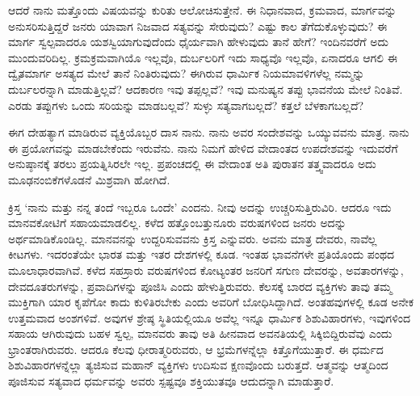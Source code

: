 ಆದರೆ ನಾನು ಮತ್ತೊಂದು ವಿಷಯವನ್ನು ಕುರಿತು ಆಲೋಚಿಸುತ್ತೇನೆ. ಈ ನಿಧಾನವಾದ, ಕ್ರಮವಾದ, ಮಾರ್ಗವನ್ನು ಅನುಸರಿಸುತ್ತಿದ್ದರೆ ಜನರು ಯಾವಾಗ ನಿಜವಾದ ಸತ್ಯವನ್ನು ಸೇರುವುದು? ಎಷ್ಟು ಕಾಲ ತೆಗೆದುಕೊಳ್ಳುವುದು? ಈ ಮಾರ್ಗ ಸ್ವಲ್ಪವಾದರೂ ಯಶಸ್ವಿಯಾಗುವುದೆಂದು ಧೈರ್ಯವಾಗಿ ಹೇಳುವುದು ತಾನೆ ಹೇಗೆ? ಇಂದಿನವರೆಗೆ ಅದು ಮುಂದುವರಿದಿಲ್ಲ. ಕ್ರಮಕ್ರಮವಾಗಿಯೊ ಇಲ್ಲವೊ, ದುರ್ಬಲರಿಗೆ ಇದು ಸಾಧ್ಯವೊ ಇಲ್ಲವೊ, ಏನಾದರೂ ಆಗಲಿ ಈ ದ್ವೈತಮಾರ್ಗ ಅಸತ್ಯದ ಮೇಲೆ ತಾನೆ ನಿಂತಿರುವುದು? ಈಗಿರುವ ಧಾರ್ಮಿಕ ನಿಯಮಾವಳಿಗಳೆಲ್ಲ ನಮ್ಮನ್ನು ದುರ್ಬಲರನ್ನಾಗಿ ಮಾಡುತ್ತಿಲ್ಲವೆ? ಆದಕಾರಣ ಇವು ತಪ್ಪಲ್ಲವೆ? ಇವು ಮನುಷ್ಯನ ತಪ್ಪು ಭಾವನೆಯ ಮೇಲೆ ನಿಂತಿವೆ. ಎರಡು ತಪ್ಪುಗಳು ಒಂದು ಸರಿಯನ್ನು ಮಾಡಬಲ್ಲವೆ? ಸುಳ್ಳು ಸತ್ಯವಾಗಬಲ್ಲದೆ? ಕತ್ತಲೆ ಬೆಳಕಾಗಬಲ್ಲದೆ?

ಈಗ ದೇಹತ್ಯಾಗ ಮಾಡಿರುವ ವ್ಯಕ್ತಿಯೊಬ್ಬರ ದಾಸ ನಾನು. ನಾನು ಅವರ ಸಂದೇಶವನ್ನು ಒಯ್ಯುವವನು ಮಾತ್ರ. ನಾನು ಈ ಪ್ರಯೋಗವನ್ನು ಮಾಡಬೇಕೆಂದು ಇರುವೆನು. ನಾನು ನಿಮಗೆ ಹೇಳಿದ ವೇದಾಂತದ ಉಪದೇಶವನ್ನು ಇದುವರೆಗೆ ಅನುಷ್ಠಾನಕ್ಕೆ ತರಲು ಪ್ರಯತ್ನಿಸಿರಲೇ ಇಲ್ಲ. ಪ್ರಪಂಚದಲ್ಲಿ ಈ ವೇದಾಂತ ಅತಿ ಪುರಾತನ ತತ್ತ್ವವಾದರೂ ಅದು ಮೂಢನಂಬಿಕೆಗಳೊಡನೆ ಮಿಶ್ರವಾಗಿ ಹೋಗಿದೆ.

ಕ್ರಿಸ್ತ `ನಾನು ಮತ್ತು ನನ್ನ ತಂದೆ ಇಬ್ಬರೂ ಒಂದೇ' ಎಂದನು. ನೀವು ಅದನ್ನು ಉಚ್ಚರಿಸುತ್ತಿರುವಿರಿ. ಆದರೂ ಇದು ಮಾನವಕೋಟಿಗೆ ಸಹಾಯಮಾಡಲಿಲ್ಲ. ಕಳೆದ ಹತ್ತೊಂಬತ್ತುನೂರು ವರುಷಗಳಿಂದ ಜನರು ಅದನ್ನು ಅರ್ಥಮಾಡಿಕೊಂಡಿಲ್ಲ. ಮಾನವನನ್ನು ಉದ್ದರಿಸುವವನು ಕ್ರಿಸ್ತ ಎನ್ನುವರು. ಅವನು ಮಾತ್ರ ದೇವರು, ನಾವೆಲ್ಲ ಕೀಟಗಳು. ಇದರಂತೆಯೇ ಭಾರತ ಮತ್ತು ಇತರ ದೇಶಗಳಲ್ಲಿ ಕೂಡ. ಇಂತಹ ಭಾವನೆಗಳೇ ಪ್ರತಿಯೊಂದು ಪಂಥದ ಮೂಲಾಧಾರವಾಗಿವೆ. ಕಳೆದ ಸಹಸ್ರಾರು ವರುಷಗಳಿಂದ ಕೋಟ್ಯಂತರ ಜನರಿಗೆ ಸಗುಣ ದೇವರನ್ನು, ಅವತಾರಗಳನ್ನು, ದೇವದೂತರುಗಳನ್ನು, ಪ್ರವಾದಿಗಳನ್ನು ಪೂಜಿಸಿ ಎಂದು ಹೇಳುತ್ತಿರುವರು. ಕೆಲಸಕ್ಕೆ ಬಾರದ ವ್ಯಕ್ತಿಗಳು ತಾವು ತಮ್ಮ ಮುಕ್ತಿಗಾಗಿ ಯಾರ ಕೃಪೆಗೋ ಕಾದು ಕುಳಿತಿರಬೇಕು ಎಂದು ಅವರಿಗೆ ಬೋಧಿಸಿದ್ದಾಗಿದೆ. ಅಂತಹವುಗಳಲ್ಲಿ ಕೂಡ ಅನೇಕ ಉತ್ತಮವಾದ ಅಂಶಗಳಿವೆ. ಅವುಗಳ ಶ್ರೇಷ್ಠ ಸ್ಥಿತಿಯಲ್ಲಿಯೂ ಅವೆಲ್ಲ ಇನ್ನೂ ಧಾರ್ಮಿಕ ಶಿಶುವಿಹಾರಗಳು, ಇವುಗಳಿಂದ ಸಹಾಯ ಆಗಿರುವುದು ಬಹಳ ಸ್ವಲ್ಪ, ಮಾನವರು ತಾವು ಅತಿ ಹೀನವಾದ ಅವನತಿಯಲ್ಲಿ ಸಿಕ್ಕಿಬಿದ್ದಿರುವೆವು ಎಂದು ಭ್ರಾಂತರಾಗಿರುವರು. ಆದರೂ ಕೆಲವು ಧೀರಾತ್ಮರಿರುವರು, ಆ ಭ್ರಮೆಗಳನ್ನೆಲ್ಲಾ ಕಿತ್ತೊಗೆಯುತ್ತಾರೆ. ಈ ಧರ್ಮದ ಶಿಶುವಿಹಾರಗಳನ್ನೆಲ್ಲಾ ತ್ಯಜಿಸುವ ಮಹಾನ್ ವ್ಯಕ್ತಿಗಳು ಉದಿಸುವ ಕ್ಷಣವೊಂದು ಬರುತ್ತದೆ. ಆತ್ಮವನ್ನು ಆತ್ಮದಿಂದ ಪೂಜಿಸುವ ಸತ್ಯವಾದ ಧರ್ಮವನ್ನು ಅವರು ಸ್ಪಷ್ಟವೂ ಶಕ್ತಿಯುತವೂ ಆದುದನ್ನಾಗಿ ಮಾಡುತ್ತಾರೆ.

